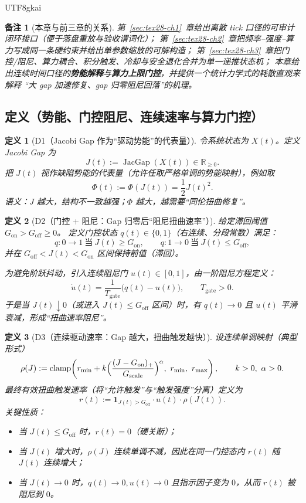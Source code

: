 \documentclass[12pt]{article}
\newtheorem{definition}{定义}[section]
\newtheorem{remark}{备注}[section]
\newcommand{\RR}{\mathbb{R}}
\newcommand{\JacGap}{\operatorname{JacGap}}
\newcommand{\indicator}[1]{\mathbf{1}_{#1}}
\newcommand{\clamp}{\operatorname{clamp}}
\begin{document}
\begin{CJK*}{UTF8}{gkai}
\begin{remark}[本章与前三章的关系]
第~\ref{sec:tex28-ch1}~章给出离散 tick 口径的可审计闭环接口（便于落盘重放与验收谓词化）；
第~\ref{sec:tex28-ch2}~章把频率--强度--算力写成同一条硬约束并给出单参数缩放的可解构造；
第~\ref{sec:tex28-ch3}~章把门控/阻尼、算力耦合、积分触发、冷却与安全退化合并为单一递推状态机；
本章给出连续时间口径的\textbf{势能解释}与\textbf{算力上限门控}，并提供一个统计力学式的耗散直观来解释
“大 gap 加速修复、gap 归零阻尼回落”的机理。
\end{remark}

\subsection{定义（势能、门控阻尼、连续速率与算力门控）}
\label{subsec:tex28-ch4-defs}

\begin{definition}[D1（Jacobi Gap 作为“驱动势能”的代表量）]
\label{def:tex28-ch4-d1}
令系统状态为 $X(t)$。定义 Jacobi Gap 为
\[
  J(t):=\JacGap(X(t))\in\RR_{\ge 0}.
\]
把 $J(t)$ 视作缺陷势能的代表量（允许任取严格单调的势能映射），例如取
\[
  \Phi(t):=\Phi(J(t))=\frac12 J(t)^2.
\]
语义：$J$ 越大，结构不一致越强；$\Phi$ 越大，越需要“同伦扭曲修复”。
\end{definition}

\begin{definition}[D2（门控 + 阻尼：Gap 归零后“阻尼扭曲速率”）]
\label{def:tex28-ch4-d2}
给定滞回阈值 $G_{\mathrm{on}}>G_{\mathrm{off}}\ge 0$。
定义门控状态 $q(t)\in\{0,1\}$（右连续、分段常数）满足：
\[
  q:0\to 1\ \text{当}\ J(t)\ge G_{\mathrm{on}},
  \qquad
  q:1\to 0\ \text{当}\ J(t)\le G_{\mathrm{off}},
\]
并在 $G_{\mathrm{off}}<J(t)<G_{\mathrm{on}}$ 区间保持前值（滞回）。

为避免阶跃抖动，引入连续阻尼门 $u(t)\in[0,1]$，由一阶阻尼方程定义：
\[
  \dot u(t)=\frac{1}{T_{\mathrm{gate}}}\bigl(q(t)-u(t)\bigr),
  \qquad
  T_{\mathrm{gate}}>0.
\]
于是当 $J(t)\downarrow 0$（或进入 $J(t)\le G_{\mathrm{off}}$ 区间）时，有 $q(t)\to 0$ 且 $u(t)$ 平滑衰减，形成“扭曲速率阻尼”。
\end{definition}

\begin{definition}[D3（连续驱动速率：Gap 越大，扭曲触发越快）]
\label{def:tex28-ch4-d3}
设连续单调映射（典型形式）
\[
  \rho(J):=\clamp\!\left(
  r_{\min}+k\Bigl(\frac{(J-G_{\mathrm{on}})_{+}}{G_{\mathrm{scale}}}\Bigr)^{\alpha},
  \ r_{\min},\ r_{\max}\right),
  \qquad
  k>0,\ \alpha>0.
\]
最终有效扭曲触发速率（将“允许触发”与“触发强度”分离）定义为
\[
  r(t):=\indicator{J(t)>G_{\mathrm{off}}}\cdot u(t)\cdot \rho(J(t)).
\]
关键性质：
\begin{itemize}
  \item 当 $J(t)\le G_{\mathrm{off}}$ 时，$r(t)=0$（硬关断）；
  \item 当 $J(t)$ 增大时，$\rho(J)$ 连续单调不减，因此在同一门控态内 $r(t)$ 随 $J(t)$ 连续增大；
  \item 当 $J(t)\to 0$ 时，$q(t)\to 0,u(t)\to 0$ 且指示因子变为 $0$，从而 $r(t)$ 被阻尼到 $0$。
\end{itemize}
\end{definition}


\end{CJK*}
\end{document}
